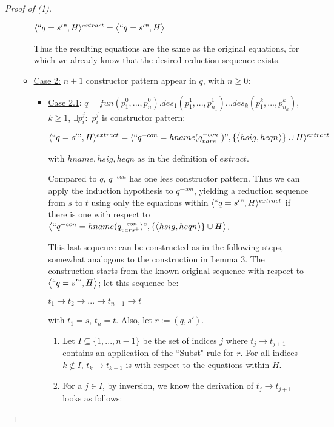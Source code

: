 \documentclass[11pt]{article} %
\begin{document}
\begin{proof}[Proof of (1)]
\begin{enumerate}
\begin{itemize}
$\langle `` q = s' ", H \rangle^{extract} = \big\langle `` q = s' ", H \big\rangle$

Thus the resulting equations are the same as the original equations, for which we already know that the desired reduction sequence exists.

\item \underline{Case 2:} $n+1$ constructor pattern appear in $q$, with $n \geq 0$:

\begin{itemize}

\item \underline{Case 2.1}: $q = fun(p^0_1, ..., p^0_n).des_1(p^1_1, ..., p^1_{n_1})...des_k(p^k_1, ..., p^k_{n_k})$, $k \geq 1$, $\exists p^j_i:$ $p^j_i$ is constructor pattern:

$\langle `` q = s' ", H \rangle^{extract} = \langle `` q^{-con} = hname (q^{-con}_{vars^+}) ", \{\big\langle hsig, heqn \big\rangle\} \cup H \rangle^{extract}$

with $hname, hsig, heqn$ as in the definition of $extract$.

Compared to $q$, $q^{-con}$ has one less constructor pattern. Thus we can apply the induction hypothesis to $q^{-con}$, yielding a reduction sequence from $s$ to $t$ using only the equations within $\langle `` q = s' ", H \rangle^{extract}$ if there is one with respect to $\big\langle `` q^{-con} = hname (q^{-con}_{vars^+}) ", \{\big\langle hsig, heqn \big\rangle\} \cup H \big\rangle$.

This last sequence can be constructed as in the following steps, somewhat analogous to the construction in Lemma 3. The construction starts from the known original sequence with respect to $\big\langle `` q = s' ", H \big\rangle$; let this sequence be:

$t_1 \longrightarrow t_2 \longrightarrow ... \longrightarrow t_{n-1} \longrightarrow t$

with $t_1 = s$, $t_n = t$. Also, let $r := (q, s')$.

\begin{enumerate}

\item Let $I \subseteq \{1, ..., n - 1\}$ be the set of indices $j$ where $t_j \longrightarrow t_{j+1}$ contains an application of the ``Subst" rule for $r$. For all indices $k \not\in I$, $t_k \longrightarrow t_{k+1}$ is with respect to the equations within $H$.

\item For a $j \in I$, by inversion, we know the derivation of $t_j \longrightarrow t_{j+1}$ looks as follows:


\end{enumerate}
\end{itemize}
\end{itemize}
\end{enumerate}
\end{proof}
\end{document}
